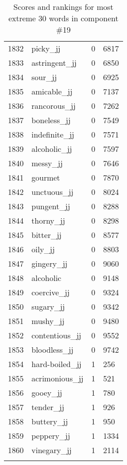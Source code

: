\begin{longtable}[!htbp]{| rlr@{.}l |}
    1832 & picky\_jj & 0 & 6817 \\
    1833 & astringent\_jj & 0 & 6850 \\
    1834 & sour\_jj & 0 & 6925 \\
    1835 & amicable\_jj & 0 & 7137 \\
    1836 & rancorous\_jj & 0 & 7262 \\
    1837 & boneless\_jj & 0 & 7549 \\
    1838 & indefinite\_jj & 0 & 7571 \\
    1839 & alcoholic\_jj & 0 & 7597 \\
    1840 & messy\_jj & 0 & 7646 \\
    1841 & gourmet & 0 & 7870 \\
    1842 & unctuous\_jj & 0 & 8024 \\
    1843 & pungent\_jj & 0 & 8288 \\
    1844 & thorny\_jj & 0 & 8298 \\
    1845 & bitter\_jj & 0 & 8577 \\
    1846 & oily\_jj & 0 & 8803 \\
    1847 & gingery\_jj & 0 & 9060 \\
    1848 & alcoholic & 0 & 9148 \\
    1849 & coercive\_jj & 0 & 9324 \\
    1850 & sugary\_jj & 0 & 9342 \\
    1851 & mushy\_jj & 0 & 9480 \\
    1852 & contentious\_jj & 0 & 9552 \\
    1853 & bloodless\_jj & 0 & 9742 \\
    1854 & hard-boiled\_jj & 1 & 256 \\
    1855 & acrimonious\_jj & 1 & 521 \\
    1856 & gooey\_jj & 1 & 780 \\
    1857 & tender\_jj & 1 & 926 \\
    1858 & buttery\_jj & 1 & 950 \\
    1859 & peppery\_jj & 1 & 1334 \\
    1860 & vinegary\_jj & 1 & 2114 \\
    \hline
    \caption{Scores and rankings for most extreme 30 words in component \#19} \\
\end{longtable}
